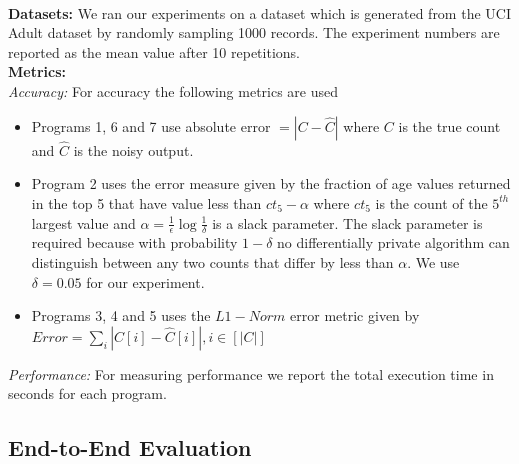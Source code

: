 \\\textbf{Datasets:}
We ran our experiments on a dataset which is generated from the UCI Adult dataset by randomly sampling 1000 records. The experiment numbers are reported as the mean value after 10 repetitions.
\\\textbf{Metrics:}
\\\textit{Accuracy:} For accuracy the following metrics are used
\begin{itemize}\item Programs 1, 6 and 7 use absolute error $ =|C-\hat{C}|$ where $C$ is the true count and $\hat{C}$ is the noisy  output. \item Program 2 uses the error measure given by the fraction of age values returned in the top 5 that have value less than $ct_5-\alpha$  where  $ct_5$ is the count of the $5^{th}$ largest value and $\alpha=\frac{1}{\epsilon}\log\frac{1}{\delta}$ is a slack parameter. The slack parameter is required because with probability $1-\delta$ no differentially private algorithm can distinguish between any two counts that differ by less than $\alpha$. We use $\delta=0.05$ for our experiment. \item Programs 3, 4 and 5 uses the $L1-Norm$ error metric given  by $Error=\sum_{i}|C[i]-\hat{C}[i]|, i \in [|C|]$ \end{itemize}
\textit{Performance:} For measuring performance we report the total execution time in seconds for each program.
\subsection{End-to-End Evaluation}
